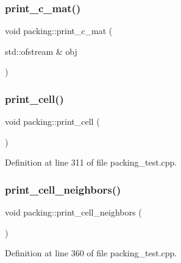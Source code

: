 \subsubsection{\texorpdfstring{print\+\_\+c\+\_\+mat()}{print\_c\_mat()}\hspace{0.1cm}{\footnotesize\ttfamily [2/2]}}
{\footnotesize\ttfamily void packing\+::print\+\_\+c\+\_\+mat (\begin{DoxyParamCaption}\item[{std\+::ofstream \&}]{obj }\end{DoxyParamCaption})}

\mbox{\label{classpacking_af52187be2ba3d6cc25189c7cd389ba18}} 
\subsubsection{\texorpdfstring{print\+\_\+cell()}{print\_cell()}}
{\footnotesize\ttfamily void packing\+::print\+\_\+cell (\begin{DoxyParamCaption}{ }\end{DoxyParamCaption})}



Definition at line 311 of file packing\+\_\+test.\+cpp.

\mbox{\label{classpacking_a6f594a2ebfaaf03a8a43f31d5e170b86}} 
\subsubsection{\texorpdfstring{print\+\_\+cell\+\_\+neighbors()}{print\_cell\_neighbors()}}
{\footnotesize\ttfamily void packing\+::print\+\_\+cell\+\_\+neighbors (\begin{DoxyParamCaption}{ }\end{DoxyParamCaption})}



Definition at line 360 of file packing\+\_\+test.\+cpp.

\mbox{\label{classpacking_a1dfafb1273eef9839012796f8f674cd3}} 
